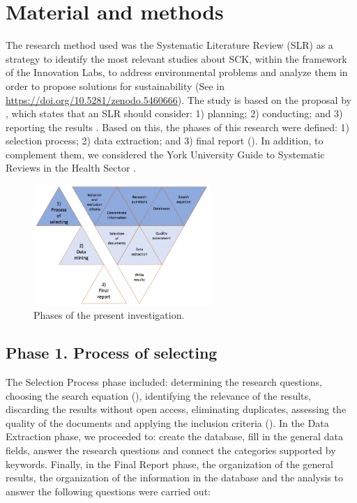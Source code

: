 \documentclass[english]{textolivre}
\begin{document}
\section{Material and methods}
The research method used was the Systematic Literature Review (SLR) as a strategy to identify the most relevant studies about SCK, within the framework of the Innovation Labs, to address environmental problems and analyze them in order to propose solutions for sustainability (See in \url{https://doi.org/10.5281/zenodo.5460666}). The study is based on the proposal by \textcite{kitchenham2007}, which states that an SLR should consider: 1) planning; 2) conducting; and 3) reporting the results \cite{kitchenham2010}. Based on this, the phases of this research were defined: 1) selection process; 2) data extraction; and 3) final report (). In addition, to complement them, we considered the York University Guide to Systematic Reviews in the Health Sector \cite{centre_for_reviews_and_dissemination_crds_2020}.

\begin{figure}[htbp]
 \centering
 \includegraphics[width=0.6\textwidth]{fig1-33750.jpg}
 \caption{Phases of the present investigation.}
 \label{fig1}
\end{figure}

\subsection*{Phase 1. Process of selecting}
The Selection Process phase included: determining the research questions, choosing the search equation (), identifying the relevance of the results, discarding the results without open access, eliminating duplicates, assessing the quality of the documents and applying the inclusion criteria (). In the Data Extraction phase, we proceeded to: create the database, fill in the general data fields, answer the research questions and connect the categories supported by keywords. Finally, in the Final Report phase, the organization of the general results, the organization of the information in the database and the analysis to answer the following questions were carried out:
\end{document}
